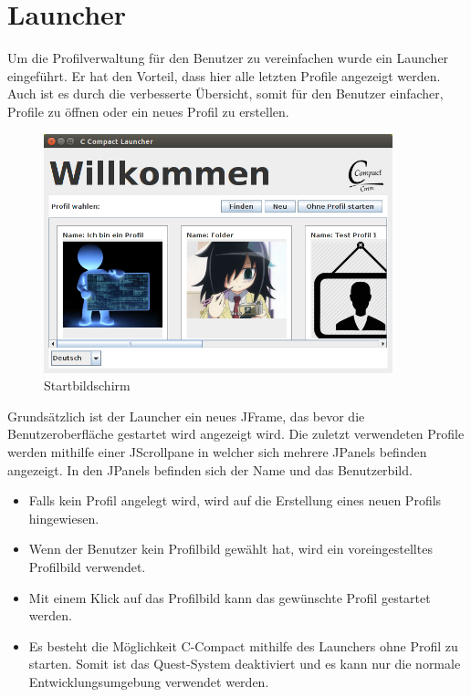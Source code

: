 \section{Launcher}

Um die Profilverwaltung für den Benutzer zu vereinfachen wurde ein Launcher eingeführt. Er hat den Vorteil, dass hier alle letzten Profile angezeigt werden. Auch ist es durch die verbesserte Übersicht, somit für den Benutzer einfacher, Profile zu öffnen oder ein neues Profil zu erstellen.

\begin{figure}[h] 
  \centering
     \includegraphics[width=0.9\textwidth]{./media/images/gui/launcher/launcher_main.png}
  \caption{Startbildschirm}
  \label{fig:Bild1}
\end{figure}

Grundsätzlich ist der Launcher ein neues JFrame, das bevor die Benutzeroberfläche gestartet wird angezeigt wird. Die zuletzt verwendeten Profile werden mithilfe einer JScrollpane in welcher sich mehrere JPanels befinden angezeigt. In den JPanels befinden sich der Name und das Benutzerbild.

\begin{itemize}
\item Falls kein Profil angelegt wird, wird auf die Erstellung eines neuen Profils hingewiesen.
\item Wenn der Benutzer kein Profilbild gewählt hat, wird ein voreingestelltes Profilbild verwendet.
\item Mit einem Klick auf das Profilbild kann das gewünschte Profil gestartet werden.
\item Es besteht die Möglichkeit C-Compact mithilfe des Launchers ohne Profil zu starten. Somit ist das Quest-System deaktiviert und es kann nur die normale Entwicklungsumgebung verwendet werden.
\end{itemize}

